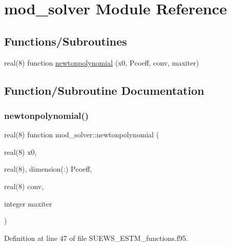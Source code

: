 \hypertarget{namespacemod__solver}{}\section{mod\+\_\+solver Module Reference}
\label{namespacemod__solver}
\subsection*{Functions/\+Subroutines}
\begin{DoxyCompactItemize}
\item 
real(8) function \hyperlink{namespacemod__solver_a7906d5a56feebc123a09f0898a0a54e5}{newtonpolynomial} (x0, Pcoeff, conv, maxiter)
\end{DoxyCompactItemize}


\subsection{Function/\+Subroutine Documentation}
\mbox{\label{namespacemod__solver_a7906d5a56feebc123a09f0898a0a54e5}} 
\subsubsection{\texorpdfstring{newtonpolynomial()}{newtonpolynomial()}}
{\footnotesize\ttfamily real(8) function mod\+\_\+solver\+::newtonpolynomial (\begin{DoxyParamCaption}\item[{real(8)}]{x0,  }\item[{real(8), dimension(\+:)}]{Pcoeff,  }\item[{real(8)}]{conv,  }\item[{integer}]{maxiter }\end{DoxyParamCaption})}



Definition at line 47 of file S\+U\+E\+W\+S\+\_\+\+E\+S\+T\+M\+\_\+functions.\+f95.

